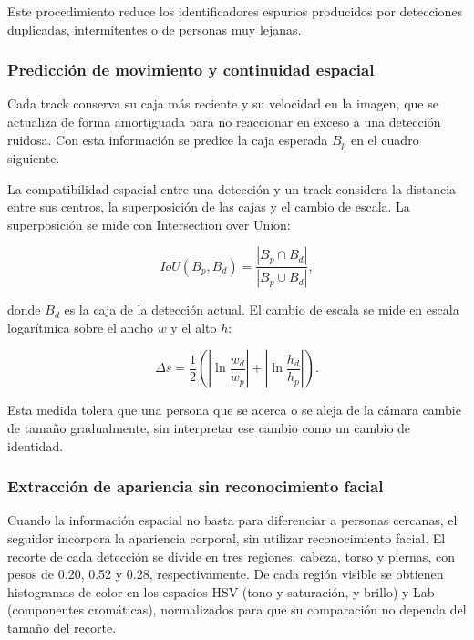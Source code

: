 \documentclass[12pt,letterpaper]{article}
\begin{document}
Este procedimiento reduce los identificadores espurios producidos por
detecciones duplicadas, intermitentes o de personas muy lejanas.

\subsubsection{Predicción de movimiento y continuidad espacial}

Cada track conserva su caja más reciente y su velocidad en la imagen,
que se actualiza de forma amortiguada para no reaccionar en exceso a una
detección ruidosa. Con esta información se predice la caja esperada
$B_p$ en el cuadro siguiente.

La compatibilidad espacial entre una detección y un track considera la
distancia entre sus centros, la superposición de las cajas y el cambio
de escala. La superposición se mide con Intersection over Union:

\begin{equation}
IoU(B_p,B_d)=
\frac{|B_p \cap B_d|}
{|B_p \cup B_d|},
\end{equation}

donde $B_d$ es la caja de la detección actual. El cambio de escala se
mide en escala logarítmica sobre el ancho $w$ y el alto $h$:

\begin{equation}
\Delta s=
\frac{1}{2}
\left(
\left|\ln\frac{w_d}{w_p}\right|
+
\left|\ln\frac{h_d}{h_p}\right|
\right).
\end{equation}

Esta medida tolera que una persona que se acerca o se aleja de la cámara
cambie de tamaño gradualmente, sin interpretar ese cambio como un cambio
de identidad.

\subsubsection{Extracción de apariencia sin reconocimiento facial}

Cuando la información espacial no basta para diferenciar a personas
cercanas, el seguidor incorpora la apariencia corporal, sin utilizar
reconocimiento facial. El recorte de cada detección se divide en tres
regiones: cabeza, torso y piernas, con pesos de 0.20, 0.52 y 0.28,
respectivamente. De cada región visible se obtienen histogramas de color
en los espacios HSV (tono y saturación, y brillo) y Lab (componentes
cromáticas), normalizados para que su comparación no dependa del tamaño
del recorte.
\end{document}
